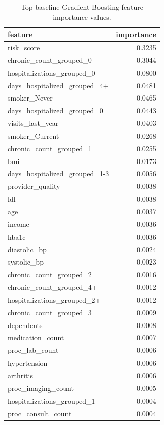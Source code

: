 \begin{table}
\caption{Top baseline Gradient Boosting feature importance values.}
\label{tab:05-gb-feature-importance}
\begin{tabular}{lr}
\toprule
feature & importance \\
\midrule
risk_score & 0.3235 \\
chronic_count_grouped_0 & 0.3044 \\
hospitalizations_grouped_0 & 0.0800 \\
days_hospitalized_grouped_4+ & 0.0481 \\
smoker_Never & 0.0465 \\
days_hospitalized_grouped_0 & 0.0443 \\
visits_last_year & 0.0403 \\
smoker_Current & 0.0268 \\
chronic_count_grouped_1 & 0.0255 \\
bmi & 0.0173 \\
days_hospitalized_grouped_1-3 & 0.0056 \\
provider_quality & 0.0038 \\
ldl & 0.0038 \\
age & 0.0037 \\
income & 0.0036 \\
hba1c & 0.0036 \\
diastolic_bp & 0.0024 \\
systolic_bp & 0.0023 \\
chronic_count_grouped_2 & 0.0016 \\
chronic_count_grouped_4+ & 0.0012 \\
hospitalizations_grouped_2+ & 0.0012 \\
chronic_count_grouped_3 & 0.0009 \\
dependents & 0.0008 \\
medication_count & 0.0007 \\
proc_lab_count & 0.0006 \\
hypertension & 0.0006 \\
arthritis & 0.0006 \\
proc_imaging_count & 0.0005 \\
hospitalizations_grouped_1 & 0.0004 \\
proc_consult_count & 0.0004 \\
\bottomrule
\end{tabular}
\end{table}
